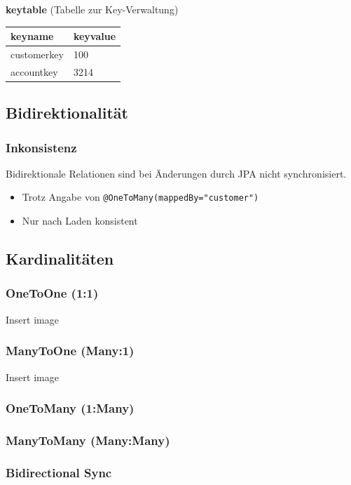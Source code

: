 \documentclass[a4paper, landscape, 8pt]{scrartcl}
\begin{document}
\begin{multicols*}{4}
        \textbf{keytable} (Tabelle zur Key-Verwaltung)\\
        \begin{tabularx}{\columnwidth}{l | X}
            \textbf{keyname} & \textbf{keyvalue} \\
            \hline
            customerkey & 100 \\
            \hline
            accountkey & 3214
        \end{tabularx}

        \subsection{Bidirektionalität}
        \subsubsection{Inkonsistenz}
        Bidirektionale Relationen sind bei Änderungen durch JPA nicht synchronisiert.
        \begin{itemize}
            \item Trotz Angabe von \texttt{@OneToMany(mappedBy="customer")}
            \item Nur nach Laden konsistent
        \end{itemize}

        \subsection{Kardinalitäten}
        \subsubsection{OneToOne (1:1)}
        Insert image

        \subsubsection{ManyToOne (Many:1)}
        Insert image

        \subsubsection{OneToMany (1:Many)}
        \subsubsection{ManyToMany (Many:Many)}


        \subsubsection{Bidirectional Sync}


\end{multicols*}
\end{document}
